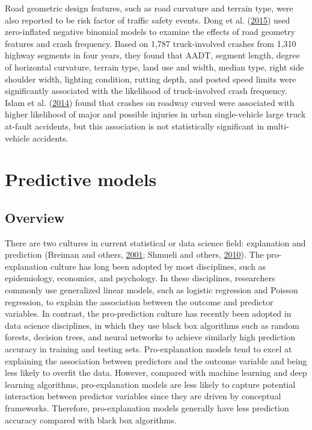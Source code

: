 \documentclass[12pt]{book}
\numberwithin{equation}{chapter}
\begin{document}
Road geometric design features, such as road curvature and terrain type, were also reported to be risk factor of traffic safety events. Dong et al. (\protect\hyperlink{ref-dong2015assessment}{2015}) used zero-inflated negative binomial models to examine the effects of road geometry features and crash frequency. Based on 1,787 truck-involved crashes from 1,310 highway segments in four years, they found that AADT, segment length, degree of horizontal curvature, terrain type, land use and width, median type, right side shoulder width, lighting condition, rutting depth, and posted speed limits were significantly associated with the likelihood of truck-involved crash frequency. Islam et al. (\protect\hyperlink{ref-islam2014comprehensive}{2014}) found that crashes on roadway curved were associated with higher likelihood of major and possible injuries in urban single-vehicle large truck at-fault accidents, but this association is not statistically significant in multi-vehicle accidents.

\hypertarget{predictive-models}{%
\section{Predictive models}\label{predictive-models}}

\hypertarget{overview}{%
\subsection{Overview}\label{overview}}

There are two cultures in current statistical or data science field: explanation and prediction (Breiman and others, \protect\hyperlink{ref-breiman2001statistical}{2001}; Shmueli and others, \protect\hyperlink{ref-shmueli2010explain}{2010}). The pro-explanation culture has long been adopted by most disciplines, such as epidemiology, economics, and psychology. In these disciplines, researchers commonly use generalized linear models, such as logistic regression and Poisson regression, to explain the association between the outcome and predictor variables. In contrast, the pro-prediction culture has recently been adopted in data science disciplines, in which they use black box algorithms such as random forests, decision trees, and neural networks to achieve similarly high prediction accuracy in training and testing sets. Pro-explanation models tend to excel at explaining the association between predictors and the outcome variable and being less likely to overfit the data. However, compared with machine learning and deep learning algorithms, pro-explanation models are less likely to capture potential interaction between predictor variables since they are driven by conceptual frameworks. Therefore, pro-explanation models generally have less prediction accuracy compared with black box algorithms.
\end{document}

